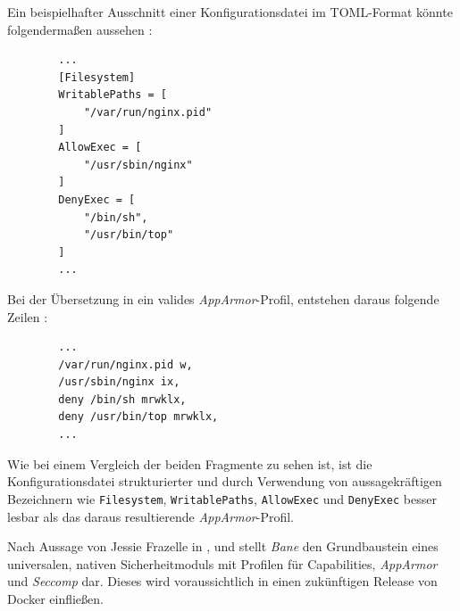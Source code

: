 \documentclass[../main.tex]{subfiles}
\begin{document}
      Ein beispielhafter Ausschnitt einer Konfigurationsdatei im \acrshort{TOML}-Format könnte folgendermaßen aussehen \cite{https://github.com/jfrazelle/bane/blob/0ceb725f531cfb95a82a3586f6318343f3f8d17c/sample.toml}:

      \begin{lstlisting}
        ...
        [Filesystem]
        WritablePaths = [
        	"/var/run/nginx.pid"
        ]
        AllowExec = [
        	"/usr/sbin/nginx"
        ]
        DenyExec = [
        	"/bin/sh",
        	"/usr/bin/top"
        ]
        ...
      \end{lstlisting}

      Bei der Übersetzung in ein valides \emph{AppArmor}-Profil, entstehen daraus folgende Zeilen \cite{https://github.com/jfrazelle/bane/blob/master/docker-nginx-sample}:

      \begin{lstlisting}
        ...
        /var/run/nginx.pid w,
        /usr/sbin/nginx ix,
        deny /bin/sh mrwklx,
        deny /usr/bin/top mrwklx,
        ...
      \end{lstlisting}

      Wie bei einem Vergleich der beiden Fragmente zu sehen ist, ist die Konfigurationsdatei strukturierter und durch Verwendung von aussagekräftigen Bezeichnern wie \texttt{Filesystem}, \texttt{WritablePaths}, \texttt{AllowExec} und \texttt{DenyExec} besser lesbar als das daraus resultierende \emph{AppArmor}-Profil.

      Nach Aussage von Jessie Frazelle in
      \cite{https://github.com/jfrazelle/bane/blob/bbc594c9dce4351b1175737cb3b4d9ee65803648/README.md}, %
      und \cite{https://blog.docker.com/2016/02/docker-engine-1-10-security/} stellt \emph{Bane} den Grundbaustein eines universalen, nativen Sicherheitmoduls mit Profilen für Capabilities, \emph{AppArmor} und \emph{Seccomp} dar. Dieses wird voraussichtlich in einen zukünftigen Release von Docker einfließen.
\end{document}
